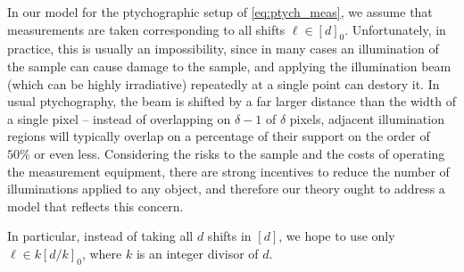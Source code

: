 In our model for the ptychographic setup of \eqref{eq:ptych_meas}, we assume that measurements are taken corresponding to all shifts $\ell \in [d]_0$.  Unfortunately, in practice, this is usually an impossibility, since in many cases an illumination of the sample can cause damage to the sample, and applying the illumination beam (which can be highly irradiative) repeatedly at a single point can destory it.  In usual ptychography, the beam is shifted by a far larger distance than the width of a single pixel -- instead of overlapping on $\delta - 1$ of $\delta$ pixels, adjacent illumination regions will typically overlap on a percentage of their support on the order of $50\%$ or even less.  Considering the risks to the sample and the costs of operating the measurement equipment, there are strong incentives to reduce the number of illuminations applied to any object, and therefore our theory ought to address a model that reflects this concern.

In particular, instead of taking all $d$ shifts in $[d]$, we hope to use only $\ell \in k [d / k]_0$, where $k$ is an integer divisor of $d$.  
